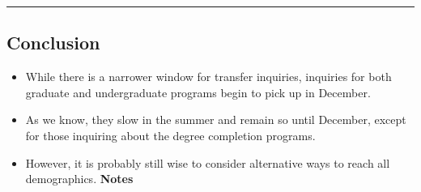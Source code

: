 \documentclass[]{tufte-handout}
\begin{document}
\begin{center}\rule{0.5\linewidth}{\linethickness}\end{center}

\subsection{Conclusion}\label{conclusion}

\begin{itemize}
\item
  While there is a narrower window for transfer inquiries, inquiries for
  both graduate and undergraduate programs begin to pick up in December.
\item
  As we know, they slow in the summer and remain so until December,
  except for those inquiring about the degree completion programs.
\item
  However, it is probably still wise to consider alternative ways to
  reach all demographics. \textbf{Notes}
\end{itemize}


\end{document}
